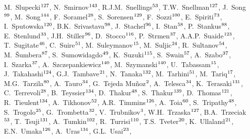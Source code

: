 \begin{flushleft}
M.~Slupecki$^\textrm{\scriptsize 127}$,
N.~Smirnov$^\textrm{\scriptsize 143}$,
R.J.M.~Snellings$^\textrm{\scriptsize 53}$,
T.W.~Snellman$^\textrm{\scriptsize 127}$,
J.~Song$^\textrm{\scriptsize 99}$,
M.~Song$^\textrm{\scriptsize 144}$,
F.~Soramel$^\textrm{\scriptsize 28}$,
S.~Sorensen$^\textrm{\scriptsize 129}$,
F.~Sozzi$^\textrm{\scriptsize 100}$,
E.~Spiriti$^\textrm{\scriptsize 73}$,
I.~Sputowska$^\textrm{\scriptsize 120}$,
B.K.~Srivastava$^\textrm{\scriptsize 98}$,
J.~Stachel$^\textrm{\scriptsize 96}$,
I.~Stan$^\textrm{\scriptsize 58}$,
P.~Stankus$^\textrm{\scriptsize 88}$,
E.~Stenlund$^\textrm{\scriptsize 33}$,
J.H.~Stiller$^\textrm{\scriptsize 96}$,
D.~Stocco$^\textrm{\scriptsize 116}$,
P.~Strmen$^\textrm{\scriptsize 37}$,
A.A.P.~Suaide$^\textrm{\scriptsize 123}$,
T.~Sugitate$^\textrm{\scriptsize 46}$,
C.~Suire$^\textrm{\scriptsize 51}$,
M.~Suleymanov$^\textrm{\scriptsize 15}$,
M.~Suljic$^\textrm{\scriptsize 24}$,
R.~Sultanov$^\textrm{\scriptsize 54}$,
M.~\v{S}umbera$^\textrm{\scriptsize 87}$,
S.~Sumowidagdo$^\textrm{\scriptsize 49}$,
K.~Suzuki$^\textrm{\scriptsize 115}$,
S.~Swain$^\textrm{\scriptsize 57}$,
A.~Szabo$^\textrm{\scriptsize 37}$,
I.~Szarka$^\textrm{\scriptsize 37}$,
A.~Szczepankiewicz$^\textrm{\scriptsize 140}$,
M.~Szymanski$^\textrm{\scriptsize 140}$,
U.~Tabassam$^\textrm{\scriptsize 15}$,
J.~Takahashi$^\textrm{\scriptsize 124}$,
G.J.~Tambave$^\textrm{\scriptsize 21}$,
N.~Tanaka$^\textrm{\scriptsize 132}$,
M.~Tarhini$^\textrm{\scriptsize 51}$,
M.~Tariq$^\textrm{\scriptsize 17}$,
M.G.~Tarzila$^\textrm{\scriptsize 80}$,
A.~Tauro$^\textrm{\scriptsize 34}$,
G.~Tejeda Mu\~{n}oz$^\textrm{\scriptsize 2}$,
A.~Telesca$^\textrm{\scriptsize 34}$,
K.~Terasaki$^\textrm{\scriptsize 131}$,
C.~Terrevoli$^\textrm{\scriptsize 28}$,
B.~Teyssier$^\textrm{\scriptsize 134}$,
D.~Thakur$^\textrm{\scriptsize 48}$,
S.~Thakur$^\textrm{\scriptsize 139}$,
D.~Thomas$^\textrm{\scriptsize 121}$,
R.~Tieulent$^\textrm{\scriptsize 134}$,
A.~Tikhonov$^\textrm{\scriptsize 52}$,
A.R.~Timmins$^\textrm{\scriptsize 126}$,
A.~Toia$^\textrm{\scriptsize 60}$,
S.~Tripathy$^\textrm{\scriptsize 48}$,
S.~Trogolo$^\textrm{\scriptsize 25}$,
G.~Trombetta$^\textrm{\scriptsize 32}$,
V.~Trubnikov$^\textrm{\scriptsize 3}$,
W.H.~Trzaska$^\textrm{\scriptsize 127}$,
B.A.~Trzeciak$^\textrm{\scriptsize 53}$,
T.~Tsuji$^\textrm{\scriptsize 131}$,
A.~Tumkin$^\textrm{\scriptsize 102}$,
R.~Turrisi$^\textrm{\scriptsize 110}$,
T.S.~Tveter$^\textrm{\scriptsize 20}$,
K.~Ullaland$^\textrm{\scriptsize 21}$,
E.N.~Umaka$^\textrm{\scriptsize 126}$,
A.~Uras$^\textrm{\scriptsize 134}$,
G.L.~Usai$^\textrm{\scriptsize 23}$,

\end{flushleft}
